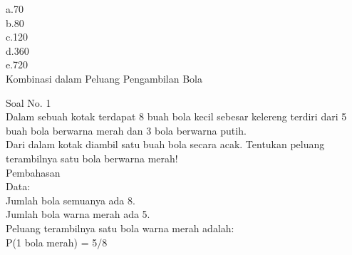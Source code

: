 \documentclass[11pt,fleqn]{book} %
\begin{document}
a.70\\

b.80\\

c.120\\

d.360\\

e.720\\


Kombinasi dalam Peluang Pengambilan Bola

Soal No. 1\\
Dalam sebuah kotak terdapat 8 buah bola kecil sebesar kelereng terdiri dari 5 buah bola berwarna merah dan 3 bola berwarna putih.\\
Dari dalam kotak diambil satu buah bola secara acak.
Tentukan peluang terambilnya satu bola berwarna merah!\\

Pembahasan\\
Data:\\
Jumlah bola semuanya ada 8.\\
Jumlah bola warna merah ada 5.\\

Peluang terambilnya satu bola warna merah adalah:\\
P(1 bola merah) = 5/8 \\
\end{document}
